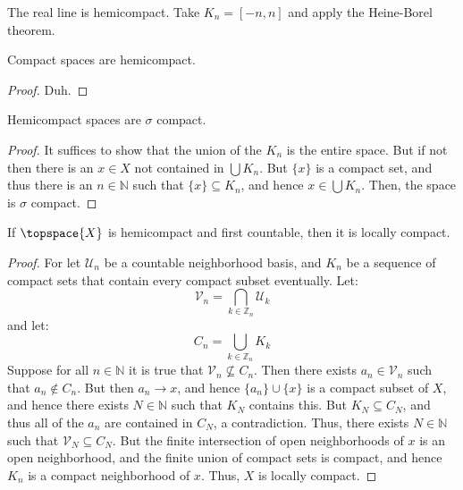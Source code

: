 \documentclass{article}                                                        %
\begin{document}
        \begin{example}
            The real line is hemicompact. Take $K_{n}=[\minus{n},n]$ and apply
            the Heine-Borel theorem.
        \end{example}
        \begin{theorem}
            Compact spaces are hemicompact.
        \end{theorem}
        \begin{proof}
            Duh.
        \end{proof}
        \begin{theorem}
            Hemicompact spaces are $\sigma$ compact.
        \end{theorem}
        \begin{proof}
            It suffices to show that the union of the $K_{n}$ is the entire
            space. But if not then there is an $x\in{X}$ not contained in
            $\bigcup{K}_{n}$. But $\{x\}$ is a compact set, and thus there is an
            $n\in\mathbb{N}$ such that $\{x\}\subseteq{K}_{n}$, and hence
            $x\in\bigcup{K}_{n}$. Then, the space is $\sigma$ compact.
        \end{proof}
        \begin{theorem}
            If $\topspace{X}$ is hemicompact and first countable, then it is
            locally compact.
        \end{theorem}
        \begin{proof}
            For let $\mathcal{U}_{n}$ be a countable neighborhood basis, and
            $K_{n}$ be a sequence of compact sets that contain every compact
            subset eventually. Let:
            \begin{equation}
                \mathcal{V}_{n}=\bigcap_{k\in\mathbb{Z}_{n}}\mathcal{U}_{k}
            \end{equation}
            and let:
            \begin{equation}
                C_{n}=\bigcup_{k\in\mathbb{Z}_{n}}K_{k}
            \end{equation}
            Suppose for all $n\in\mathbb{N}$ it is true that
            $\mathcal{V}_{n}\nsubseteq{C}_{n}$. Then there exists
            $a_{n}\in\mathcal{V}_{n}$ such that $a_{n}\notin{C}_{n}$. But then
            $a_{n}\rightarrow{x}$, and hence $\{a_{n}\}\cup\{x\}$ is a compact
            subset of $X$, and hence there exists $N\in\mathbb{N}$ such that
            $K_{N}$ contains this. But $K_{N}\subseteq{C}_{N}$, and thus
            all of the $a_{n}$ are contained in $C_{N}$, a contradiction. Thus,
            there exists $N\in\mathbb{N}$ such that
            $\mathcal{V}_{N}\subseteq{C}_{N}$. But the finite intersection of
            open neighborhoods of $x$ is an open neighborhood, and the finite
            union of compact sets is compact, and hence $K_{n}$ is a compact
            neighborhood of $x$. Thus, $X$ is locally compact.
        \end{proof}
\end{document}
